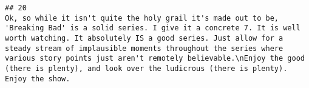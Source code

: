 \documentclass[
]{article}
\begin{document}
\begin{verbatim}
## 20                                                                                                                                                                                                                                                                                                                                                                                                                                                                                                                                                                                                                                                                                                                                                                                                                                                                                                                                                                                                                                                                                                                                                                                                                                                                                                                                                                                                                                                                                                                                                                                                                                                                                                                                                                                   Ok, so while it isn't quite the holy grail it's made out to be, 'Breaking Bad' is a solid series. I give it a concrete 7. It is well worth watching. It absolutely IS a good series. Just allow for a steady stream of implausible moments throughout the series where various story points just aren't remotely believable.\nEnjoy the good (there is plenty), and look over the ludicrous (there is plenty). Enjoy the show.

\end{verbatim}
\end{document}
